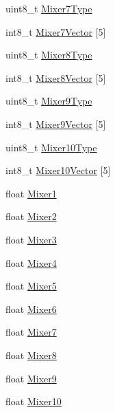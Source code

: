 \begin{DoxyCompactItemize}
\item 
uint8\-\_\-t \hyperlink{struct____attribute_____a16dccc1c36bf848904106e8717c9fe90}{\-Mixer7\-Type}
\item 
int8\-\_\-t \hyperlink{struct____attribute_____abe2318860fb8225ade075c3eca79d3dc}{\-Mixer7\-Vector} \mbox{[}5\mbox{]}
\item 
uint8\-\_\-t \hyperlink{struct____attribute_____a4012aaa0eefed32f539adf08a69c9a8e}{\-Mixer8\-Type}
\item 
int8\-\_\-t \hyperlink{struct____attribute_____af2df4cacf934b252731b3e7da63f66be}{\-Mixer8\-Vector} \mbox{[}5\mbox{]}
\item 
uint8\-\_\-t \hyperlink{struct____attribute_____abc7b15943a13a97f6cdb3e42441cdc36}{\-Mixer9\-Type}
\item 
int8\-\_\-t \hyperlink{struct____attribute_____ae662d3cf3cb389ba3222aee5912f47e5}{\-Mixer9\-Vector} \mbox{[}5\mbox{]}
\item 
uint8\-\_\-t \hyperlink{struct____attribute_____aa8223c53124cad03784a9947111265d8}{\-Mixer10\-Type}
\item 
int8\-\_\-t \hyperlink{struct____attribute_____a9157cb09ccb8487f68494002fe1eed89}{\-Mixer10\-Vector} \mbox{[}5\mbox{]}
\item 
float \hyperlink{struct____attribute_____a39ea84a685fa3ed9bb6e615646fba4ac}{\-Mixer1}
\item 
float \hyperlink{struct____attribute_____a3f4506e5905f14d672d69fc402c2d379}{\-Mixer2}
\item 
float \hyperlink{struct____attribute_____a85316b61e750255c9eb3fc0874241801}{\-Mixer3}
\item 
float \hyperlink{struct____attribute_____a7ee10b5fc6b488f89f199043797381bb}{\-Mixer4}
\item 
float \hyperlink{struct____attribute_____a8007aef1411f2e75b3feaa1c4287d8e5}{\-Mixer5}
\item 
float \hyperlink{struct____attribute_____a60e8a9e26ff74994a6774f093ed42714}{\-Mixer6}
\item 
float \hyperlink{struct____attribute_____ae9bab814c00fc24a315af3cfb0b35410}{\-Mixer7}
\item 
float \hyperlink{struct____attribute_____a1bb6f27ca263e9b3d9cc9cfd16ba67c0}{\-Mixer8}
\item 
float \hyperlink{struct____attribute_____afbd3dcd3077f3f60891522435b86a0e5}{\-Mixer9}
\item 
float \hyperlink{struct____attribute_____a588819a12e7b2c0fa7dd26cecb59761c}{\-Mixer10}
\item 

\end{DoxyCompactItemize}
